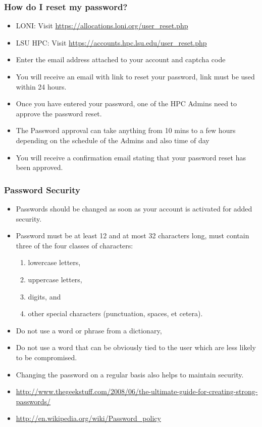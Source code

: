 \documentclass[slidestop,mathserif,compress,xcolor=svgnames,table]{beamer}
\begin{document}
\begin{frame}
  \frametitle{\small How do I reset my password?}
  \begin{itemize}
    \item LONI: Visit \url{https://allocations.loni.org/user_reset.php}
    \item LSU HPC: Visit \url{https://accounts.hpc.lsu.edu/user_reset.php}
    \item Enter the email address attached to your account and captcha code
    \item You will receive an email with link to reset your password, link must be used within 24 hours.
    \item Once you have entered your password, one of the HPC Admins need to approve the password reset.
    \item The Password approval can take anything from 10 mins to a few hours depending on the schedule of the Admins and also time of day
    \item You will receive a confirmation email stating that your password reset has been approved.
  \end{itemize}
\end{frame}

\begin{frame}
  \frametitle{\small Password Security}
  \begin{itemize}
    \item Passwords should be changed as soon as your account is activated for added security.
    \item Password must be at least 12 and at most 32 characters long, must contain three of the four classes of characters:
    \begin{enumerate}
      \item lowercase letters,
      \item uppercase letters, 
      \item digits, and 
      \item other special characters (punctuation, spaces, et cetera).
    \end{enumerate}
    \item Do not use a word or phrase from a dictionary,
    \item Do not use a word that can be obviously tied to the user which are less likely to be compromised.
    \item Changing the password on a regular basis also helps to maintain security.
    \item {\scriptsize \url{http://www.thegeekstuff.com/2008/06/the-ultimate-guide-for-creating-strong-passwords/}}
    \item {\scriptsize \url{http://en.wikipedia.org/wiki/Password_policy}}
  \end{itemize}
\end{frame}
\end{document}
